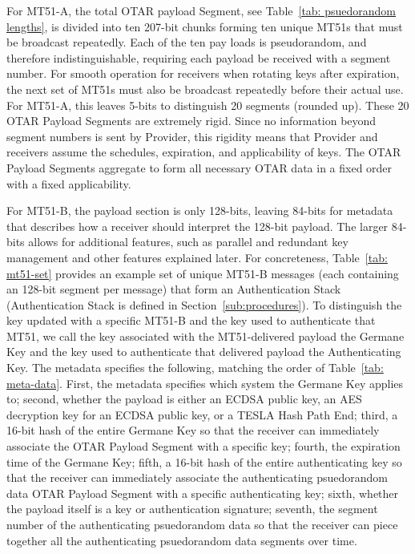 \documentclass[letterpaper,times]{IONconf/IONconf}
\begin{document}
		For MT51-A, the total OTAR payload Segment, see Table~\ref{tab: psuedorandom lengths}, is divided into ten 207-bit chunks forming ten unique MT51s that must be broadcast repeatedly.
		Each of the ten pay loads is pseudorandom, and therefore indistinguishable, requiring each payload be received with a segment number.
		For smooth operation for receivers when rotating keys after expiration, the next set of MT51s must also be broadcast repeatedly before their actual use.
		For MT51-A, this leaves 5-bits to distinguish 20 segments (rounded up).
		These 20 OTAR Payload Segments are extremely rigid.
		Since no information beyond segment numbers is sent by Provider, this rigidity means that Provider and receivers assume the schedules, expiration, and applicability of keys.
		The OTAR Payload Segments aggregate to form all necessary OTAR data in a fixed order with a fixed applicability.
		
		For MT51-B, the payload section is only 128-bits, leaving 84-bits for metadata that describes how a receiver should interpret the 128-bit payload.
		The larger 84-bits allows for additional features, such as parallel and redundant key management and other features explained later.
		For concreteness, Table~\ref{tab: mt51-set} provides an example set of unique MT51-B messages (each containing an 128-bit segment per message) that form an Authentication Stack (Authentication Stack is defined in Section~\ref{sub:procedures}).
		To distinguish the key updated with a specific MT51-B and the key used to authenticate that MT51, we call the key associated with the MT51-delivered payload the Germane Key and the key used to authenticate that delivered payload the Authenticating Key.
		The metadata specifies the following, matching the order of Table~\ref{tab: meta-data}.
		First, the metadata specifies which system the Germane Key applies to;
		second, whether the payload is either an ECDSA public key, an AES decryption key for an ECDSA public key, or a TESLA Hash Path End;
		third, a 16-bit hash of the entire Germane Key so that the receiver can immediately associate the OTAR Payload Segment with a specific key;
		fourth, the expiration time of the Germane Key;
		fifth, a 16-bit hash of the entire authenticating key so that the receiver can immediately associate the authenticating psuedorandom data OTAR Payload Segment with a specific authenticating key;
		sixth, whether the payload itself is a key or authentication signature;
		seventh, the segment number of the authenticating psuedorandom data so that the receiver can piece together all the authenticating psuedorandom data segments over time.
\end{document}

